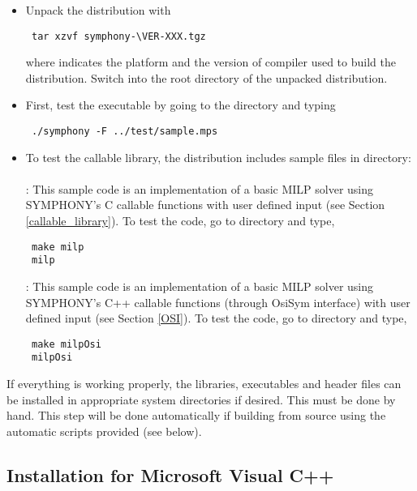 \begin{itemize}
\item Unpack the distribution with
{\color{Brown}
\begin{verbatim}
 tar xzvf symphony-\VER-XXX.tgz
\end{verbatim}
}
where  indicates the platform and the version of 
compiler used to build the distribution. 
Switch into the root directory of the unpacked distribution. 

\item First, test the executable by going to the  directory and
typing 
{\color{Brown}
\begin{verbatim}
 ./symphony -F ../test/sample.mps
\end{verbatim}
}
\item To test the callable library, the distribution
includes sample files in  directory:  \\ \\
: This sample code is an implementation of a basic MILP
solver using SYMPHONY's C callable functions with user defined input (see
Section
\ref{callable_library}). To test the code, go to  directory and
type, {\color{Brown}
\begin{verbatim}
 make milp 
 milp
 \end{verbatim}}
: This sample code is an implementation of a basic MILP 
solver using SYMPHONY's C++ callable functions (through OsiSym interface)
with user defined input (see Section \ref{OSI}). To test the code, 
go to  directory and type, 
{\color{Brown}
\begin{verbatim}
 make milpOsi
 milpOsi
 \end{verbatim}}
\end{itemize}

If everything is working properly, the libraries, executables and header files
can be installed in appropriate system directories if desired. This must be
done by hand. This step will be done automatically if building from source
using the automatic scripts provided (see below).

\subsection{Installation for Microsoft Visual C++}

